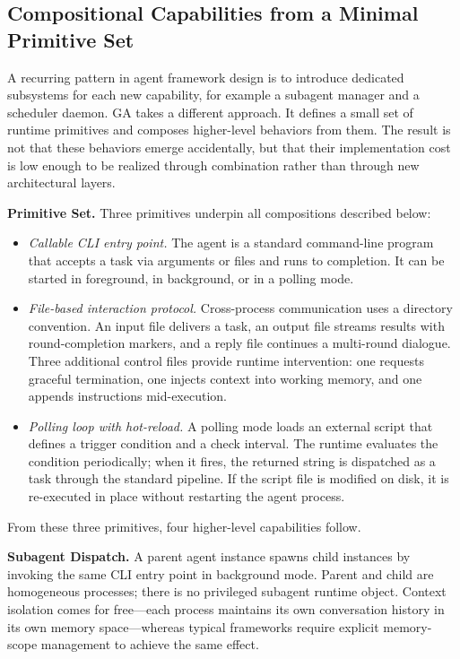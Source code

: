 \subsection{Compositional Capabilities from a Minimal Primitive Set}

A recurring pattern in agent framework design is to introduce dedicated subsystems for each new capability, for example a subagent manager and a scheduler daemon. GA takes a different approach. It defines a small set of runtime primitives and composes higher-level behaviors from them. The result is not that these behaviors emerge accidentally, but that their implementation cost is low enough to be realized through combination rather than through new architectural layers.

\textbf{Primitive Set.}
Three primitives underpin all compositions described below:

\begin{itemize}
  \item \emph{Callable CLI entry point.} The agent is a standard command-line program that accepts a task via arguments or files and runs to completion. It can be started in foreground, in background, or in a polling mode.
  \item \emph{File-based interaction protocol.} Cross-process communication uses a directory convention. An input file delivers a task, an output file streams results with round-completion markers, and a reply file continues a multi-round dialogue. Three additional control files provide runtime intervention: one requests graceful termination, one injects context into working memory, and one appends instructions mid-execution.
  \item \emph{Polling loop with hot-reload.} A polling mode loads an external script that defines a trigger condition and a check interval. The runtime evaluates the condition periodically; when it fires, the returned string is dispatched as a task through the standard pipeline. If the script file is modified on disk, it is re-executed in place without restarting the agent process.
\end{itemize}

From these three primitives, four higher-level capabilities follow.

\textbf{Subagent Dispatch.}
A parent agent instance spawns child instances by invoking the same CLI entry point in background mode. Parent and child are homogeneous processes; there is no privileged subagent runtime object. Context isolation comes for free—each process maintains its own conversation history in its own memory space—whereas typical frameworks require explicit memory-scope management to achieve the same effect.

